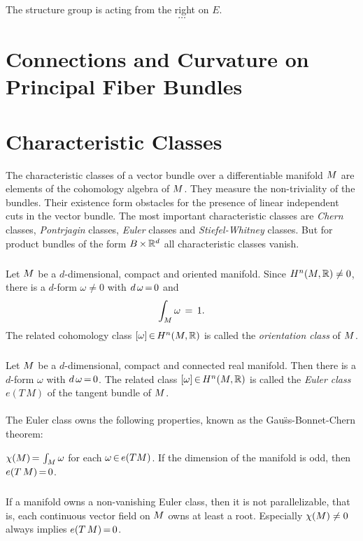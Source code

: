 \documentclass[11pt,twoside]{article}
\begin{document}
\subparagraph{}
The structure group is acting from the right on $E$.
\[
\ldots
\]

\section{Connections and Curvature on Principal Fiber Bundles}

\section{Characteristic Classes}
The characteristic classes of a vector bundle
over a differentiable manifold $\difM$ are elements of the cohomology algebra
of $\difM$.
They measure the non-triviality of the bundles.
Their existence form obstacles for the presence of linear
independent cuts in the vector bundle.
The most important characteristic classes are \textit{Chern} classes,
\textit{Pontrjagin} classes, \textit{Euler} classes
and \textit{Stiefel-Whitney} classes.
But for product bundles of the form $\cross{B}{\R^d}$
all characteristic classes vanish.

\subparagraph{}
Let $\difM$ be a $d$-dimensional, compact and oriented manifold.
Since $H^n(\difM,\R) \neq 0$,
there is a $d$-form $\omega \neq 0$ with $d \, \omega \eq 0$ and
\[
\int_M \omega \= 1.
\]
The related cohomology class $[\omega] \xeof H^n(\difM,\R)$ is called the
\textit{orientation class} of $\difM$.

\subparagraph{}
Let $\difM$ be a $d$-dimensional, compact and connected real manifold.
Then there is a $d$-form $\omega$ with $d\,\omega \eq 0$.
The related class $[\omega] \xeof H^n(\difM,\R)$ is called
the \textit{Euler class} $e(T\,M)$ of the tangent bundle of $\difM$.

\paragraph{}
The Euler class owns the following properties,
known as the Gau\"ss-Bonnet-Chern theorem:

\begin{theorem}
$\chi(\difM) \eq \int_{\difM} \omega$ for each $\omega \xeof e(T\difM)$.
If the dimension of the manifold is odd, then $e(T\,\difM) \eq 0$.
\end{theorem}

\subparagraph{}
If a manifold owns a non-vanishing Euler class,
then it is not parallelizable,
that is,
each continuous vector field on $\difM$ owns at least a root.
Especially $\chi(\difM) \neq 0$ always implies $e(T\,\difM) \eq 0$.
\end{document}

